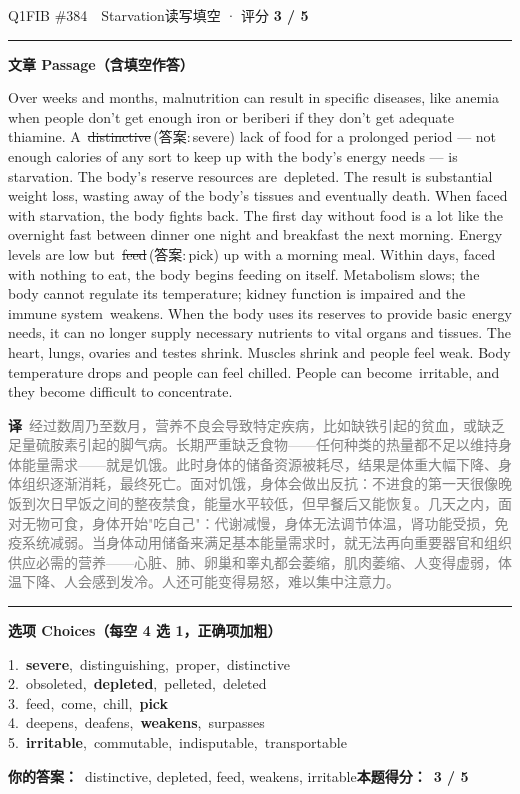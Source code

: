 \documentclass[11pt]{article}
\newcommand{\ptesub}[1]{%
  \par\needspace{2\baselineskip}\smallskip
  {\color{cAccent}\rule[-0.2ex]{3pt}{1.05em}}\hspace{6pt}%
  {\bfseries\color{cHead}#1}\par\nopagebreak\smallskip}
\newcommand{\zh}[1]{{\footnotesize\textcolor{cNote}{\textbf{译}}\ \textcolor{gray}{#1}}}
\newcommand{\rok}[1]{{\color{cFix}\ding{51}\,#1}}                 %
\newcommand{\rno}[2]{{\color{cWrong}\ding{55}\,\sout{#1}}\,{\footnotesize\color{cFix}(答案:\,#2)}}  %
\begin{document}
\begin{qblock}{Q1\quad FIB \#384\ \ Starvation}{读写填空 · 评分 \textcolor{cAccent}{\bfseries 3 / 5}}
\ptesub{文章 Passage（含填空作答）}
\begin{promptbox}
Over weeks and months, malnutrition can result in specific diseases, like anemia when people don't get enough iron or beriberi if they don't get adequate thiamine. A \rno{distinctive}{severe} lack of food for a prolonged period --- not enough calories of any sort to keep up with the body's energy needs --- is starvation. The body's reserve resources are \rok{depleted}. The result is substantial weight loss, wasting away of the body's tissues and eventually death. When faced with starvation, the body fights back. The first day without food is a lot like the overnight fast between dinner one night and breakfast the next morning. Energy levels are low but \rno{feed}{pick} up with a morning meal. Within days, faced with nothing to eat, the body begins feeding on itself. Metabolism slows; the body cannot regulate its temperature; kidney function is impaired and the immune system \rok{weakens}. When the body uses its reserves to provide basic energy needs, it can no longer supply necessary nutrients to vital organs and tissues. The heart, lungs, ovaries and testes shrink. Muscles shrink and people feel weak. Body temperature drops and people can feel chilled. People can become \rok{irritable}, and they become difficult to concentrate.
\end{promptbox}
\zh{经过数周乃至数月，营养不良会导致特定疾病，比如缺铁引起的贫血，或缺乏足量硫胺素引起的脚气病。长期严重缺乏食物——任何种类的热量都不足以维持身体能量需求——就是饥饿。此时身体的储备资源被耗尽，结果是体重大幅下降、身体组织逐渐消耗，最终死亡。面对饥饿，身体会做出反抗：不进食的第一天很像晚饭到次日早饭之间的整夜禁食，能量水平较低，但早餐后又能恢复。几天之内，面对无物可食，身体开始"吃自己"：代谢减慢，身体无法调节体温，肾功能受损，免疫系统减弱。当身体动用储备来满足基本能量需求时，就无法再向重要器官和组织供应必需的营养——心脏、肺、卵巢和睾丸都会萎缩，肌肉萎缩、人变得虚弱，体温下降、人会感到发冷。人还可能变得易怒，难以集中注意力。}
\ptesub{选项 Choices（每空 4 选 1，正确项加粗）}
{\small
1.\ \textbf{severe},\ distinguishing,\ proper,\ distinctive\\
2.\ obsoleted,\ \textbf{depleted},\ pelleted,\ deleted\\
3.\ feed,\ come,\ chill,\ \textbf{pick}\\
4.\ deepens,\ deafens,\ \textbf{weakens},\ surpasses\\
5.\ \textbf{irritable},\ commutable,\ indisputable,\ transportable}
\par\smallskip
\textbf{你的答案：}\ {\color{cWrong}distinctive}, depleted, {\color{cWrong}feed}, weakens, irritable\qquad\textbf{本题得分：}\ {\color{cAccent}\bfseries 3 / 5}
\end{qblock}
\end{document}
